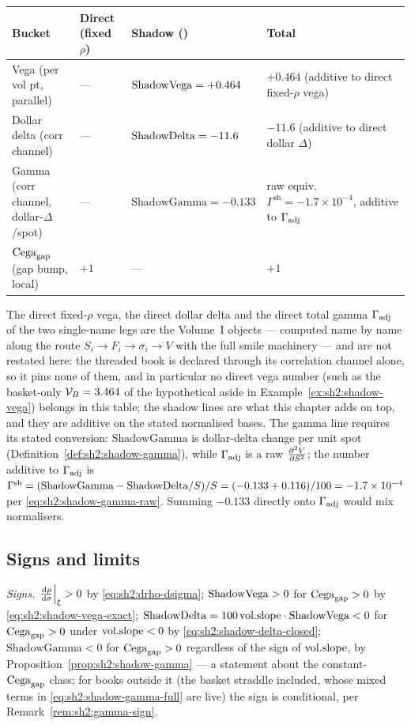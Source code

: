 \begin{center}
\renewcommand{\arraystretch}{1.35}
\begin{tabular}{@{}llll@{}}
\toprule
Bucket & Direct (fixed $\rho$) & Shadow (\stickycvc{}) & Total \\
\midrule
Vega (per vol pt, parallel) & --- & $\mathrm{ShadowVega} = +0.464$ & $+0.464$ (additive to direct fixed-$\rho$ vega) \\
Dollar delta (corr channel) & --- & $\mathrm{ShadowDelta} = -11.6$ & $-11.6$ (additive to direct dollar $\Delta$) \\
Gamma (corr channel, dollar-$\Delta$/spot) & --- & $\mathrm{ShadowGamma} = -0.133$ & raw equiv.\ $\Gamma^{\mathrm{sh}} = -1.7 \times 10^{-4}$, additive to $\Gamma_{\mathrm{adj}}$ \\
$\mathrm{Cega}_{\mathrm{gap}}$ (gap bump, local) & $+1$ & --- & $+1$ \\
\bottomrule
\end{tabular}
\end{center}

The direct fixed-$\rho$ vega, the direct dollar delta and the direct
total gamma $\Gamma_{\mathrm{adj}}$ of the two
single-name legs are the Volume~I objects --- computed name by name along
the route $S_i \to F_i \to \sigma_i \to V$ with the full smile machinery
--- and are not restated here: the threaded book is declared through its
correlation channel alone, so it pins none of them, and in particular no
direct vega number (such as the basket-only $\mathcal{V}_B = 3.464$ of the
hypothetical aside in Example~\ref{ex:sh2:shadow-vega}) belongs in this
table; the shadow lines are what this chapter adds
on top, and they are additive on the stated normalised bases. The gamma
line requires its stated conversion: $\mathrm{ShadowGamma}$ is
dollar-delta change per unit spot
(Definition~\ref{def:sh2:shadow-gamma}), while $\Gamma_{\mathrm{adj}}$ is a raw
$\frac{\partial^2 V}{\partial S^2}$; the number additive to $\Gamma_{\mathrm{adj}}$ is
$\Gamma^{\mathrm{sh}} = (\mathrm{ShadowGamma} - \mathrm{ShadowDelta}/S)/S
= (-0.133 + 0.116)/100 = -1.7 \times 10^{-4}$ per
\eqref{eq:sh2:shadow-gamma-raw}. Summing $-0.133$ directly onto $\Gamma_{\mathrm{adj}}$
would mix normalisers.

\subsection{Signs and limits}

\emph{Signs.} $\left.\frac{\mathrm{d} \rho}{\mathrm{d} \sigma}\right|_{\xi} > 0$ by
\eqref{eq:sh2:drho-dsigma}; $\mathrm{ShadowVega} > 0$ for $\mathrm{Cega}_{\mathrm{gap}} > 0$ by
\eqref{eq:sh2:shadow-vega-exact}; $\mathrm{ShadowDelta} = 100\,\mathrm{vol.slope}\cdot\mathrm{ShadowVega}
< 0$ for $\mathrm{Cega}_{\mathrm{gap}} > 0$ under $\mathrm{vol.slope} < 0$ by
\eqref{eq:sh2:shadow-delta-closed}; $\mathrm{ShadowGamma} < 0$ for
$\mathrm{Cega}_{\mathrm{gap}} > 0$ regardless of the sign of $\mathrm{vol.slope}$, by
Proposition~\ref{prop:sh2:shadow-gamma} --- a statement about the
constant-$\mathrm{Cega}_{\mathrm{gap}}$ class; for books outside it (the basket straddle
included, whose mixed terms in \eqref{eq:sh2:shadow-gamma-full} are live)
the sign is conditional, per Remark~\ref{rem:sh2:gamma-sign}.

